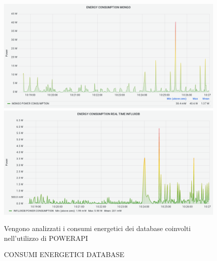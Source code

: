 \documentclass[10pt,a4paper]{article}
\begin{document}
\begin{figure}[h]
\caption{CONSUMI ENERGETICI DATABASE}
\centering
\includegraphics[scale=0.4]{image4}
\includegraphics[scale=0.4]{image7}
\begin{flushleft}
{Vengono analizzati i consumi energetici dei database coinvolti nell'utilizzo di POWERAPI}
\end{flushleft}
\end{figure}
\end{document}
